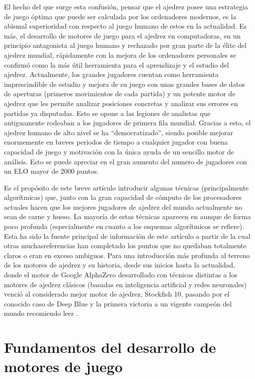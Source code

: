 \documentclass[letterpaper,12pt]{article}
\begin{document}
El hecho del que surge esta confusión, pensar que el ajedrez posee una estrategia 
de juego óptima que puede ser calculada por los ordenadores modernos, es la abismal
superioridad con respecto al juego humano de estos en la actualidad. Es más, el
desarrollo de motores de juego para el ajedrez en computadoras, en un principio 
antagonista al juego humano y rechazado por gran parte de la élite del ajedrez 
mundial, rápidamente con la mejora de los ordenadores personales se confirmó como 
la más útil herramienta para el aprendizaje y el estudio del ajedrez. Actualmente,
los grandes jugadores cuentan como herramienta imprescindible de estudio y mejora
de su juego con unas grandes bases de datos de aperturas (primeros movimientos de
cada partida) y un potente motor de ajedrez que les permite analizar posiciones
concretas y analizar sus errores en partidas ya disputadas. Esto se opone a las 
legiones de analistas que antiguamente rodeaban a los jugadores de primera fila
mundial. Gracias a esto, el ajedrez humano de alto nivel se ha ``democratizado'',
siendo posible mejorar enormemente en breves periodos de tiempo a cualquier jugador
con buena capacidad de juego y motivación con la única ayuda de un sencillo motor
de análisis. Esto se puede apreciar en el gran aumento del numero de jugadores con
un ELO \cite{Intro5} mayor de 2000 puntos.


Es el propósito de este breve artículo introducir algunas técnicas 
(principalmente algorítmicas) que, junto con la gran capacidad de cómputo de los
procesadores actuales hacen que los mejores jugadores de ajedrez del mundo 
actualmente no sean de carne y hueso. La mayoría de estas técnicas aparecen en
\cite{CPW} aunque de forma poco profunda  (especialmente en cuanto a los esquemas
algorítmicos se refiere). Esta ha sido la fuente principal de información de este
artículo a partir de la cual otras muchasreferencias han completado los puntos 
que no quedaban totalmente claros o eran en exceso ambiguos. Para una introducción
más profunda al terreno de los motores de ajedrez y su historia, desde sus inicios
hasta la actualidad, donde el motor de Google AlphaZero desarrollado con técnicas
distintas a los motores de ajedrez clásicos (basadas en inteligencia artificial y
redes neuronales) venció al considerado mejor motor de ajedrez, Stockfish 10, 
pasando por el conocido caso de Deep Blue y la primera victoria a un vigente 
campeón del mundo recomiendo leer \cite{Intro1, Intro2, Intro3, Intro4}.


\section{Fundamentos del desarrollo de motores de juego}
\end{document}
